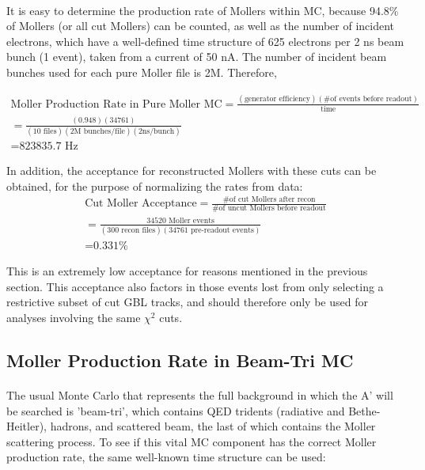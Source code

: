 \documentclass{article}
\begin{document}
	\paragraph{}
	It is easy to determine the production rate of Mollers within MC, because 94.8\% of Mollers (or all cut Mollers) can be counted, as well as the number of incident electrons, which have a well-defined time structure of 625 electrons per 2 ns beam bunch (1 event), taken from a current of 50 nA. The number of incident beam bunches used for each pure Moller file is 2M. Therefore, 
	
	\begin{equation} \label{eq:PureRate}
	\begin{split}
  	\mbox{Moller Production Rate in Pure Moller MC} = \frac{(\mbox{generator efficiency})(\mbox{\# of events before readout})}{\mbox{time}} \\
  	= \frac{(0.948)(34761)}{(\mbox{10 files})(\mbox{2M bunches/file})(\mbox{2ns/bunch})}\\= \mbox{823835.7 Hz}
  	\end{split}
	\end{equation}
	
	In addition, the acceptance for reconstructed Mollers with these cuts can be obtained, for the purpose of normalizing the rates from data:
	\begin{equation} \label{eq:MollerAcceptance}
	\begin{split}
  	\mbox{Cut Moller Acceptance} = \frac{\mbox{\# of cut Mollers after recon}}{\mbox{\# of uncut Mollers before readout}} \\
  	= \frac{34520\mbox{ Moller events}}{(\mbox{300 recon files})(\mbox{34761 pre-readout events})}\\ = \mbox{0.331\%}
  	\end{split}
	\end{equation}

	This is an extremely low acceptance for reasons mentioned in the previous section. This acceptance also factors in those events lost from only selecting a restrictive subset of cut GBL tracks, and should therefore only be used for analyses involving the same $\chi^{2}$ cuts.

	\subsection{Moller Production Rate in Beam-Tri MC}
	\paragraph{}
	The usual Monte Carlo that represents the full background in which the A' will be searched is 'beam-tri', which contains QED tridents (radiative and Bethe-Heitler), hadrons, and scattered beam, the last of which contains the Moller scattering process. To see if this vital MC component has the correct Moller production rate, the same well-known time structure can be used:
	
\end{document}
